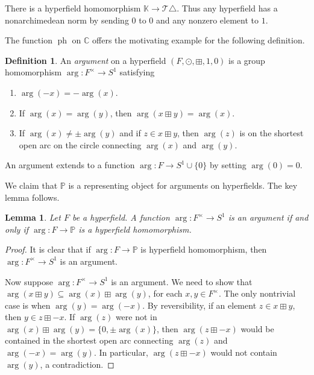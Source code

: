 \documentclass[10pt, preprint]{article}
\newtheorem{lemma}[theorem]{Lemma}
\theoremstyle{definition}
\newtheorem{definition}[theorem]{Definition}
\begin{document}
There is a hyperfield homomorphism $\mathbb{K}\to \mathcal{T }\triangle
$. Thus any hyperfield has a nonarchimedean norm by sending $0$ to
$0$ and any nonzero element to $1$.

The function $\operatorname{ph}$ on $\mathbb{C}$ offers the motivating
example for the following definition.

\begin{definition}
An \emph{argument} on a hyperfield $(F,\odot ,\boxplus ,1,0)$ is a group
homomorphism $\arg : F^{\times }\to S^{1}$ satisfying\vspace*{-2pt}
%
\begin{enumerate}%
\item
$\arg (-x) = -\arg (x)$.
%
\item
If $\arg (x) = \arg (y)$, then $\arg (x \boxplus y) = \arg (x)$.
%
\item
If $\arg (x) \neq \pm \arg (y)$ and if $z \in x \boxplus y$, then
$\arg (z)$ is on the shortest open arc on the circle connecting
$\arg (x)$ and $\arg (y)$.\vspace*{-2pt}
\end{enumerate}
%
\end{definition}

An argument extends to a function $\arg : F \to S^{1} \cup \{0\}$ by
setting $\arg (0) = 0$.

We claim that $\mathbb{P}$ is a representing object for arguments on
hyperfields. The key lemma follows.

\begin{lemma}
Let $F$ be a hyperfield. A function $\arg : F^{\times }\to S^{1}$ is an
argument if and only if $\arg : F \to \mathbb{P}$ is a hyperfield
homomorphism.
\end{lemma}

\begin{proof}
It is clear that if $\arg : F \to \mathbb{P}$ is hyperfield
homomorphism, then $\arg : F^{\times }\to S^{1}$ is an argument.

Now suppose $\arg : F^{\times }\to S^{1}$ is an argument. We need to
show that   $\arg (x \boxplus y)
\subseteq \arg (x) \boxplus \arg (y)$, for each $x,y \in F^{\times}$. The only nontrivial case is when
$\arg (y) = \arg (-x)$. By reversibility, if an element $z \in x
\boxplus y$, then $y\in z\boxplus -x$. If $\arg (z)$ were not in
$\arg (x) \boxplus \arg (y) = \{0, \pm \arg (x)\}$, then $\arg (z
\boxplus -x)$ would be\vadjust{\goodbreak} contained in the shortest open arc connecting
$\arg (z)$ and $\arg (-x)=\arg (y)$. In particular, $\arg (z\boxplus
-x)$ would not contain $\arg (y)$, a contradiction.
\end{proof}
\end{document}
